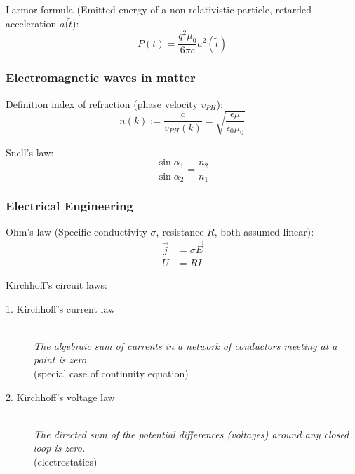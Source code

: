 			\noindent
			Larmor formula (Emitted energy of a non-relativistic particle, retarded acceleration $a(\tilde{t}$):
			\begin{equation}
				P(t) = \frac{q^2 \mu_0}{6\pi c}a^2(\tilde{t})
			\end{equation}

		\subsubsection{Electromagnetic waves in matter}
			\noindent
			Definition index of refraction (phase velocity $v_{PH}$):
			\begin{equation}
				n(k) := \frac{c}{v_{PH}(k)} = \sqrt{\frac{\epsilon\mu}{\epsilon_0\mu_0}}
			\end{equation}

			\noindent
			Snell's law:
			\begin{equation}
				\frac{\sin\alpha_1}{\sin\alpha_2} = \frac{n_2}{n_1}
			\end{equation}



		\subsubsection{Electrical Engineering}
			\noindent
			Ohm's law (Specific conductivity $\sigma$, resistance $R$, both assumed linear):
			\begin{equation}
				\begin{aligned}
					\vec{j} &= \sigma\vec{E} \\
					U &= R I
				\end{aligned}
			\end{equation}

			\noindent
			Kirchhoff's circuit laws:
			\begin{description}
				\item[1. Kirchhoff's current law] \hfill \\
					{\textit{The algebraic sum of currents in a network of conductors meeting at a point is zero.} \\(special case of continuity equation)}
				\item[2. Kirchhoff's voltage law] \hfill \\
					{\textit{The directed sum of the potential differences (voltages) around any closed loop is zero.} \\(electrostatics)}
			\end{description}


